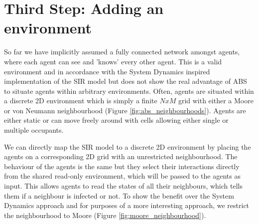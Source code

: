 \section{Third Step: Adding an environment}
\label{sec:adding_env}
So far we have implicitly assumed a fully connected network amongst agents, where each agent can see and 'knows' every other agent. This is a valid environment and in accordance with the System Dynamics inspired implementation of the SIR model but does not show the real advantage of ABS to situate agents within arbitrary environments. Often, agents are situated within a discrete 2D environment \cite{epstein_growing_1996} which is simply a finite $N x M$ grid with either a Moore or von Neumann neighbourhood (Figure \ref{fig:abs_neighbourhoods}). Agents are either static or can move freely around with cells allowing either single or multiple occupants.

We can directly map the SIR model to a discrete 2D environment by placing the agents on a corresponding 2D grid with an unrestricted neighbourhood. The behaviour of the agents is the same but they select their interactions directly from the shared read-only environment, which will be passed to the agents as input. This allows agents to read the states of all their neighbours, which tells them if a neighbour is infected or not. To show the benefit over the System Dynamics approach  and for purposes of a more interesting approach, we restrict the neighbourhood to Moore (Figure \ref{fig:moore_neighbourhood}).

